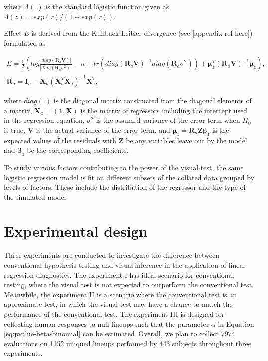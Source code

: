 \documentclass[]{interact}
\theoremstyle{plain}%
\theoremstyle{definition}
\theoremstyle{remark}
\begin{document}
\noindent where \(\Lambda(.)\) is the standard logistic function given
as \(\Lambda(z) = exp(z)/(1+exp(z))\).

Effect \(E\) is derived from the Kullback-Leibler divergence (see
{[}appendix ref here{]}) formulated as

\small

\begin{gather}  \label{eq:effect-size}
E = \frac{1}{2}\left(log\frac{|diag(\boldsymbol{R}_a\boldsymbol{V})|}{|diag(\boldsymbol{R}_a\sigma^2)|} - n + tr(diag(\boldsymbol{R}_a\boldsymbol{V})^{-1}diag(\boldsymbol{R}_a\sigma^2)) + \boldsymbol{\mu}_z^{T}(\boldsymbol{R}_a\boldsymbol{V})^{-1}\boldsymbol{\mu}_z\right),\\
\boldsymbol{R}_a = \boldsymbol{I}_n - \boldsymbol{X}_a(\boldsymbol{X}_a^T\boldsymbol{X}_a)^{-1}\boldsymbol{X}_a^T,
\end{gather}

\normalsize

\noindent where \(diag(.)\) is the diagonal matrix constructed from the
diagonal elements of a matrix,
\(\boldsymbol{X}_a = (\boldsymbol{1}, \boldsymbol{X})\) is the matrix of
regressors including the intercept used in the regression equation,
\(\sigma^2\) is the assumed variance of the error term when \(H_0\) is
true, \(\boldsymbol{V}\) is the actual variance of the error term, and
\(\boldsymbol{\mu}_z = \boldsymbol{R}_a\boldsymbol{Z}\boldsymbol{\beta}_z\)
is the expected values of the residuals with \(\boldsymbol{Z}\) be any
variables leave out by the model and \(\boldsymbol{\beta}_z\) be the
corresponding coefficients.

To study various factors contributing to the power of the visual test,
the same logistic regression model is fit on different subsets of the
collated data grouped by levels of factors. These include the
distribution of the regressor and the type of the simulated model.

\hypertarget{experimental-design}{%
\section{Experimental design}\label{experimental-design}}

Three experiments are conducted to investigate the difference between
conventional hypothesis testing and visual inference in the application
of linear regression diagnostics. The experiment I has ideal scenario
for conventional testing, where the visual test is not expected to
outperform the conventional test. Meanwhile, the experiment II is a
scenario where the conventional test is an approximate test, in which
the visual test may have a chance to match the performance of the
conventional test. The experiment III is designed for collecting human
responses to null lineups such that the parameter \(\alpha\) in Equation
\ref{eq:pvalue-beta-binomial} can be estimated. Overall, we plan to
collect 7974 evaluations on 1152 uniqued lineups performed by 443
subjects throughout three experiments.
\end{document}
